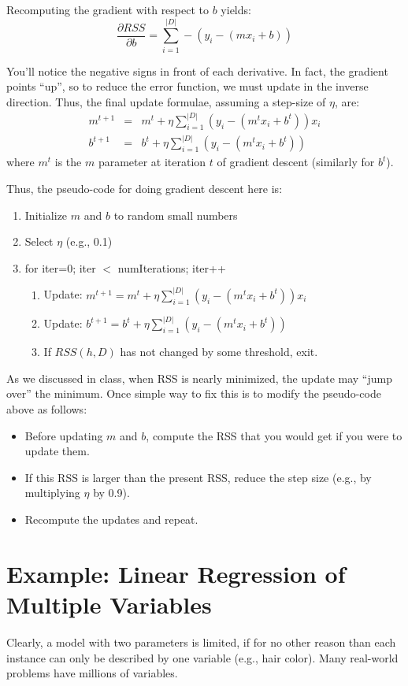 \documentclass{article}
\begin{document}
Recomputing the gradient with respect to $b$ yields:
$$
\frac{\partial RSS}{\partial b} = \sum_{i=1}^{|D|}-(y_i - (mx_i + b))
$$

You'll notice the negative signs in front of each derivative. In fact, the gradient points ``up'', so to reduce the error function, we must update in the inverse direction. Thus, the final update formulae, assuming a step-size of $\eta$, are:
\begin{eqnarray*}
m^{t+1} &=& m^t + \eta \sum_{i=1}^{|D|}(y_i - (m^tx_i + b^t))x_i\\
b^{t+1} &=& b^t + \eta \sum_{i=1}^{|D|}(y_i - (m^tx_i + b^t))
\end{eqnarray*}
where $m^t$ is the $m$ parameter at iteration $t$ of gradient descent (similarly for $b^t$).



Thus, the pseudo-code for doing gradient descent here is:
\begin{enumerate}
\item Initialize $m$ and $b$ to random small numbers
\item Select $\eta$ (e.g., 0.1)
\item for iter=0; iter $<$ numIterations; iter++
  \begin{enumerate}
    \item Update: $m^{t+1} = m^t + \eta \sum_{i=1}^{|D|}(y_i - (m^tx_i + b^t))x_i$
    \item Update: $b^{t+1} = b^t + \eta \sum_{i=1}^{|D|}(y_i - (m^tx_i + b^t))
$
     \item If $RSS(h,D)$ has not changed by some threshold, exit.
  \end{enumerate}
\end{enumerate}

As we discussed in class, when RSS is nearly minimized, the update may ``jump over'' the minimum. Once simple way to fix this is to modify the pseudo-code above as follows: 
\begin{itemize}
\item Before updating $m$ and $b$, compute the RSS that you would get if you were to update them.
\item If this RSS is larger than the present RSS, reduce the step size (e.g., by multiplying $\eta$ by 0.9).
\item Recompute the updates and repeat.
\end{itemize}

\section{Example: Linear Regression of Multiple Variables}
Clearly, a model with two parameters is limited, if for no other
reason than each instance can only be described by one variable (e.g.,
hair color). Many real-world problems have millions of variables.
\end{document}
